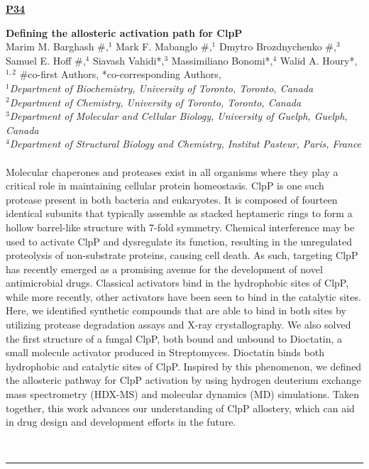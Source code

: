 \documentclass[titlepage,oneside,openany,10pt]{book}
\newenvironment{posterabs}[4] %
        {
	\begin{flushright}
                \underline{\textbf{#4}}
        \end{flushright}
        \textbf{#1}\\%
        #2\\%
        \textit{#3}\\\\%
        }
        {
        \\
        \noindent\rule{15cm}{0.5pt}%
        }
\begin{document}

\vspace{1cm}

\begin{posterabs}
    {Defining the allosteric activation path for ClpP}
    {Marim M. Barghash \#,$^{1}$ Mark F. Mabanglo \#,$^{1}$ Dmytro Brozdnychenko \#,$^{3}$ Samuel E. Hoff \#,$^{4}$ Siavash Vahidi*,$^{3}$ Massimiliano Bonomi*,$^{4}$ Walid A. Houry*,$^{1,2}$ \#co-first Authors, *co-corresponding Authors,$^{}$}
    {
    $^1$Department of Biochemistry, University of Toronto, Toronto, Canada\\
    $^2$Department of Chemistry, University of Toronto, Toronto, Canada\\
    $^3$Department of Molecular and Cellular Biology, University of Guelph, Guelph, Canada\\
    $^4$Department of Structural Biology and Chemistry, Institut Pasteur, Paris, France
    }
    {P34}
    Molecular chaperones and proteases exist in all organisms where they play a critical role in maintaining cellular protein homeostasis. ClpP is one such protease present in both bacteria and eukaryotes. It is composed of fourteen identical subunits that typically assemble as stacked heptameric rings to form a hollow barrel-like structure with 7-fold symmetry. Chemical interference may be used to activate ClpP and dysregulate its function, resulting in the unregulated proteolysis of non-substrate proteins, causing cell death. As such, targeting ClpP has recently emerged as a promising avenue for the development of novel antimicrobial drugs. Classical activators bind in the hydrophobic sites of ClpP, while more recently, other activators have been seen to bind in the catalytic sites. Here, we identified synthetic compounds that are able to bind in both sites by utilizing protease degradation assays and X-ray crystallography. We also solved the first structure of a fungal ClpP, both bound and unbound to Dioctatin, a small molecule activator produced in Streptomyces. Dioctatin binds both hydrophobic and catalytic sites of ClpP. Inspired by this phenomenon, we defined the allosteric pathway for ClpP activation by using hydrogen deuterium exchange mass spectrometry (HDX-MS) and molecular dynamics (MD) simulations. Taken together, this work advances our understanding of ClpP allostery, which can aid in drug design and development efforts in the future.
    \label{BarghashM}
\end{posterabs}
\end{document}
